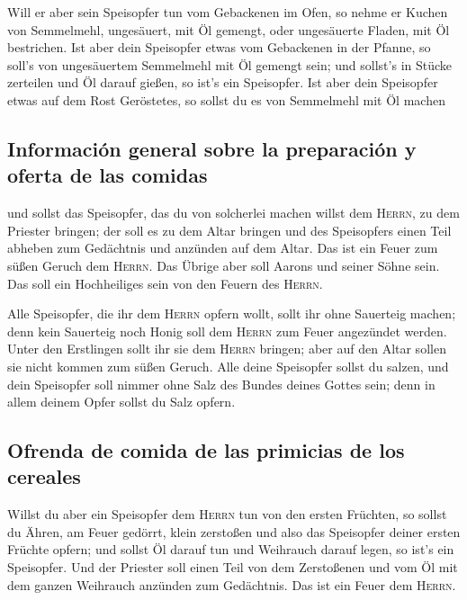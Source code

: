  Will er aber sein Speisopfer tun vom Gebackenen im Ofen,
so nehme er Kuchen von Semmelmehl, ungesäuert, mit Öl gemengt, oder
ungesäuerte Fladen, mit Öl bestrichen.  Ist aber dein
Speisopfer etwas vom Gebackenen in der Pfanne, so soll's von
ungesäuertem Semmelmehl mit Öl gemengt sein;  und sollst's
in Stücke zerteilen und Öl darauf gießen, so ist's ein Speisopfer.
 Ist aber dein Speisopfer etwas auf dem Rost Geröstetes,
so sollst du es von Semmelmehl mit Öl machen

\hypertarget{informaciuxf3n-general-sobre-la-preparaciuxf3n-y-oferta-de-las-comidas}{%
\subsection{Información general sobre la preparación y oferta de las
comidas}\label{informaciuxf3n-general-sobre-la-preparaciuxf3n-y-oferta-de-las-comidas}}

 und sollst das Speisopfer, das du von solcherlei machen
willst dem \textsc{Herrn}, zu dem Priester bringen; der soll es zu dem
Altar bringen  und des Speisopfers einen Teil abheben zum
Gedächtnis und anzünden auf dem Altar. Das ist ein Feuer zum süßen
Geruch dem \textsc{Herrn}.  Das Übrige aber soll Aarons
und seiner Söhne sein. Das soll ein Hochheiliges sein von den Feuern des
\textsc{Herrn}.

 Alle Speisopfer, die ihr dem \textsc{Herrn} opfern
wollt, sollt ihr ohne Sauerteig machen; denn kein Sauerteig noch Honig
soll dem \textsc{Herrn} zum Feuer angezündet werden. 
Unter den Erstlingen sollt ihr sie dem \textsc{Herrn} bringen; aber auf
den Altar sollen sie nicht kommen zum süßen Geruch.  Alle
deine Speisopfer sollst du salzen, und dein Speisopfer soll nimmer ohne
Salz des Bundes deines Gottes sein; denn in allem deinem Opfer sollst du
Salz opfern.

\hypertarget{ofrenda-de-comida-de-las-primicias-de-los-cereales}{%
\subsection{Ofrenda de comida de las primicias de los
cereales}\label{ofrenda-de-comida-de-las-primicias-de-los-cereales}}

 Willst du aber ein Speisopfer dem \textsc{Herrn} tun von
den ersten Früchten, so sollst du Ähren, am Feuer gedörrt, klein
zerstoßen und also das Speisopfer deiner ersten Früchte opfern;
 und sollst Öl darauf tun und Weihrauch darauf legen, so
ist's ein Speisopfer.  Und der Priester soll einen Teil
von dem Zerstoßenen und vom Öl mit dem ganzen Weihrauch anzünden zum
Gedächtnis. Das ist ein Feuer dem \textsc{Herrn}.

